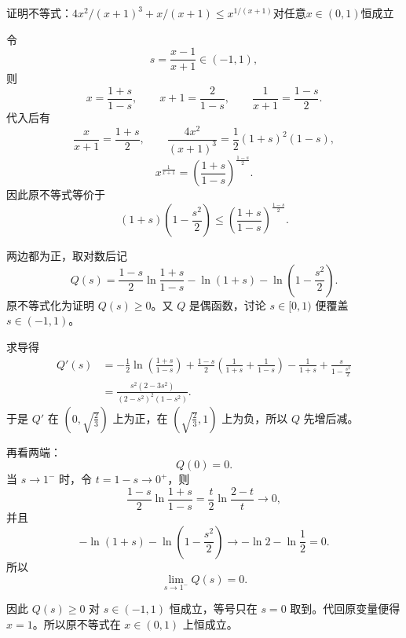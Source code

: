\begin{example}[虚调子]
证明不等式：$4x^2/(x+1)^3 + x/(x+1) \le x^{1/(x+1)}$对任意$x\in(0,1)$恒成立
\end{example}
\begin{solution}
令
\[
s=\frac{x-1}{x+1}\in(-1,1),
\]
则
\[
x=\frac{1+s}{1-s},\qquad x+1=\frac{2}{1-s},\qquad \frac{1}{x+1}=\frac{1-s}{2}.
\]
代入后有
\[
\frac{x}{x+1}=\frac{1+s}{2},\qquad \frac{4x^2}{(x+1)^3}=\frac12(1+s)^2(1-s),
\]
\[
x^{\frac{1}{x+1}}=\left(\frac{1+s}{1-s}\right)^{\frac{1-s}{2}}.
\]
因此原不等式等价于
\[
(1+s)\left(1-\frac{s^2}{2}\right)\le \left(\frac{1+s}{1-s}\right)^{\frac{1-s}{2}}.
\]

两边都为正，取对数后记
\[
Q(s)=\frac{1-s}{2}\ln\frac{1+s}{1-s}-\ln(1+s)-\ln\left(1-\frac{s^2}{2}\right).
\]
原不等式化为证明 \(Q(s)\ge0\)。又 \(Q\) 是偶函数，讨论 \(s\in[0,1)\) 便覆盖 \(s\in(-1,1)\)。

求导得
\begin{align*}
Q'(s)
&= -\frac{1}{2}\ln\left(\frac{1+s}{1-s}\right) + \frac{1-s}{2}\left(\frac{1}{1+s}+\frac{1}{1-s}\right) - \frac{1}{1+s} + \frac{s}{1-\frac{s^2}{2}} \\
&=\frac{s^2(2-3s^2)}{(2-s^2)^2(1-s^2)}.
\end{align*}
于是 \(Q'\) 在 \(\left(0,\sqrt{\frac23}\right)\) 上为正，在 \(\left(\sqrt{\frac23},1\right)\) 上为负，所以 \(Q\) 先增后减。

再看两端：
\[
Q(0)=0.
\]
当 \(s\to1^-\) 时，令 \(t=1-s\to0^+\)，则
\[
\frac{1-s}{2}\ln\frac{1+s}{1-s}=\frac{t}{2}\ln\frac{2-t}{t}\to0,
\]
并且
\[
-\ln(1+s)-\ln\left(1-\frac{s^2}{2}\right)\to -\ln2-\ln\frac12=0.
\]
所以
\[
\lim_{s\to1^-}Q(s)=0.
\]

因此 \(Q(s)\ge0\) 对 \(s\in(-1,1)\) 恒成立，等号只在 \(s=0\) 取到。代回原变量便得 \(x=1\)。所以原不等式在 \(x\in(0,1)\) 上恒成立。
\end{solution}

